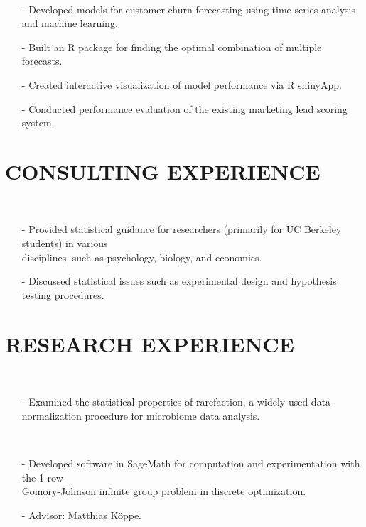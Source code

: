 \documentclass{res}
\begin{document}
\begin{resume}
     \\
    \begin{itemize}
     \item[-] Developed models for customer churn forecasting using time series analysis and machine learning.
     \item[-] Built an R package for finding the optimal combination of multiple forecasts.
     \item[-] Created interactive visualization of model performance via R shinyApp.
     \item[-] Conducted performance evaluation of the existing marketing lead scoring system.
     \end{itemize}   

\section{CONSULTING EXPERIENCE}
     
     \\ 
    \begin{itemize}
     \item[-] Provided statistical guidance for researchers (primarily for UC Berkeley students) in various \\disciplines, such as psychology, biology, and economics.
     \item[-] Discussed statistical issues such as experimental design and hypothesis testing procedures.    
    \end{itemize}     

\section{RESEARCH EXPERIENCE}
     \\ 
\begin{itemize}
        \item[-] Examined the statistical properties of rarefaction, a widely used data normalization procedure for microbiome data analysis.
        \end{itemize}
        
     \\ 
        \begin{itemize}
        \item[-] Developed software in SageMath for computation and experimentation
       with the 1-row \\ Gomory-Johnson infinite group problem in discrete optimization.
       \item[-] Advisor: Matthias K\"{o}ppe.
        \end{itemize}


\end{resume}
\end{document}
